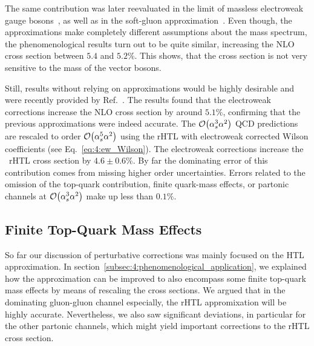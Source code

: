 The same contribution was later reevaluated in the limit of massless electroweak gauge bosons~\cite{Anastasiou:2018adr}, as well as in the soft-gluon approximation~\cite{Bonetti:2018ukf}. Even though, the approximations make completely different assumptions about the mass spectrum, the phenomenological results turn out to be quite similar, increasing the \acs{NLO} cross section between $5.4$ and $5.2\%$. This shows, that the cross section is not very sensitive to the mass of the vector bosons.

Still, results without relying on approximations would be highly desirable and were recently provided by Ref.~\cite{Becchetti:2020wof}. The results found that the electroweak corrections increase the \acs{NLO} cross section by around $5.1\%$, confirming that the previous approximations were indeed accurate. The $\mathcal{O}\!\left(\alpha_s^3 \alpha^2\right)$ QCD predictions are rescaled to order $\mathcal{O}\!\left(\alpha_s^5 \alpha^2\right)$ using the \acs{rHTL} with electroweak corrected Wilson coefficients (see Eq.~\eqref{eq:4:ew_Wilson}). The electroweak corrections increase the \NNNLO\ \acs{rHTL} cross section by $4.6 \pm 0.6\%$. By far the dominating error of this contribution comes from missing higher order uncertainties. Errors related to the omission of the top-quark contribution, finite quark-mass effects, or partonic channels at $\mathcal{O}\!\left(\alpha_s^3 \alpha^2\right)$ make up less than $0.1\%$.

\subsection{Finite Top-Quark Mass Effects}
So far our discussion of perturbative corrections was mainly focused on the \acs{HTL} approximation. In section~\ref{subsec:4:phenomenological_application}, we explained how the approximation can be improved to also encompass some finite top-quark mass effects by means of rescaling the cross sections. We argued that in the dominating gluon-gluon channel especially, the \acs{rHTL} appromixation will be highly accurate. Nevertheless, we also saw significant deviations, in particular for the other partonic channels, which might yield important corrections to the \acs{rHTL} cross section.

